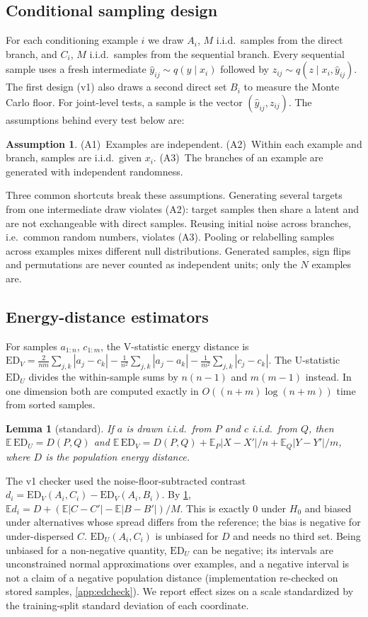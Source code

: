 \documentclass{article}
\theoremstyle{plain}
\newtheorem{lemma}[theorem]{Lemma}
\theoremstyle{definition}
\newtheorem{assumption}[theorem]{Assumption}
\theoremstyle{remark}
\newcommand{\ED}{\mathrm{ED}}
\newcommand{\E}{\mathbb{E}}
\begin{document}
\subsection{Conditional sampling design}
\label{sec:design}

For each conditioning example $i$ we draw $A_i$, $M$ i.i.d.\ samples from the direct branch, and $C_i$, $M$ i.i.d.\ samples from the sequential branch.
Every sequential sample uses a fresh intermediate $\hat y_{ij}\sim q(y\mid x_i)$ followed by $z_{ij}\sim q(z\mid x_i,\hat y_{ij})$.
The first design (v1) also draws a second direct set $B_i$ to measure the Monte Carlo floor. For joint-level tests, a sample is the vector $(\hat y_{ij},z_{ij})$.
The assumptions behind every test below are:
\begin{assumption}
\label{ass:design}
(A1)~Examples are independent. (A2)~Within each example and branch, samples are i.i.d.\ given $x_i$. (A3)~The branches of an example are generated with independent randomness.
\end{assumption}
Three common shortcuts break these assumptions.
Generating several targets from one intermediate draw violates (A2): target samples then share a latent and are not exchangeable with direct samples.
Reusing initial noise across branches, i.e.\ common random numbers, violates (A3).
Pooling or relabelling samples across examples mixes different null distributions.
Generated samples, sign flips and permutations are never counted as independent units; only the $N$ examples are.

\subsection{Energy-distance estimators}
\label{sec:ed}

For samples $a_{1:n}$, $c_{1:m}$, the V-statistic energy distance is $\ED_V=\frac{2}{nm}\sum_{j,k}|a_j-c_k|-\frac{1}{n^2}\sum_{j,k}|a_j-a_k|-\frac{1}{m^2}\sum_{j,k}|c_j-c_k|$. The U-statistic $\ED_U$ divides the within-sample sums by $n(n-1)$ and $m(m-1)$ instead.
In one dimension both are computed exactly in $O((n+m)\log(n+m))$ time from sorted samples.
\begin{lemma}[standard]
\label{lem:vbias}
If $a$ is drawn i.i.d.\ from $P$ and $c$ i.i.d.\ from $Q$, then $\E\,\ED_U=D(P,Q)$ and $\E\,\ED_V=D(P,Q)+\E_P|X-X'|/n+\E_Q|Y-Y'|/m$, where $D$ is the population energy distance.
\end{lemma}
The v1 checker used the noise-floor-subtracted contrast $d_i=\ED_V(A_i,C_i)-\ED_V(A_i,B_i)$.
By \cref{lem:vbias}, $\E d_i=D+(\E|C-C'|-\E|B-B'|)/M$. This is exactly $0$ under $H_0$ and biased under alternatives whose spread differs from the reference; the bias is negative for under-dispersed $C$.
$\ED_U(A_i,C_i)$ is unbiased for $D$ and needs no third set.
Being unbiased for a non-negative quantity, $\ED_U$ can be negative; its intervals are unconstrained normal approximations over examples, and a negative interval is not a claim of a negative population distance (implementation re-checked on stored samples, \cref{app:edcheck}).
We report effect sizes on a scale standardized by the training-split standard deviation of each coordinate.
\end{document}
